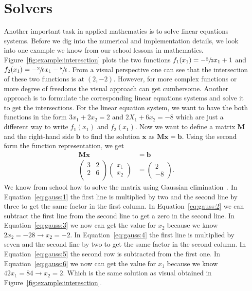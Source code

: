 \documentclass[11pt,fleqn]{book} %
\begin{document}
\chapter{Solvers}
Another important task in applied mathematics is to solve linear equations systems. Before we dig into the numerical and implementation details, we look into one example we know from our school lessons in mathematics. Figure~\ref{fig:example:interesction} plots the two functions $f_1(x_1)=-\sfrac{3}{2}x_1+1$ and  $f_2(x_1)=-\sfrac{2}{6}x_1-\sfrac{8}{6}$. From a visual perspective one can see that the intersection of these two functions is at $(2,-2)$. However, for more complex functions or more degree of freedoms the visual approach can get cumbersome. Another approach is to formulate the corresponding linear equations systems and solve it to get the intersections. For the linear equation system, we want to have the both functions in the form $3x_1+2x_2=2$ and $2X_1+6x_2=-8$ which are just a different way to write $f_1(x_1)$ and $f_2(x_1)$. Now we want to define a matrix $\mathbf{M}$ and the right-hand side $\mathbf{b}$ to find the solution $\mathbf{x}$ as $\mathbf{M}\mathbf{x}=\mathbf{b}$. Using the second form the function representation, we get 
\begin{align}
\mathbf{M}\mathbf{x}&=\mathbf{b} \\
\left(\begin{matrix}
3 & 2 \\
2 & 6 \\
\end{matrix}\right)
\left(\begin{matrix}
x_1 \\
x_2
\end{matrix}\right)
&=\left(
\begin{matrix}
2 \\
-8
\end{matrix}\right)\text{.}
\end{align}
We know from school how to solve the matrix using Gaussian elimination~\cite{brown1999contextual}. In Equation~\eqref{eq:gauss:1} the first line is multiplied by two and the second line by three to get the same factor in the first column. In Equation~\eqref{eq:gauss:2} we can subtract the first line from the second line to get a zero in the second line. In Equation~\eqref{eq:gauss:3} we now can get the value for $x_2$ because we know $2x_2=-28\rightarrow x_2=-2$. In Equation~\eqref{eq:gauss:4} the first line is multiplied by seven and the second line by two to get the same factor in the second column. In Equation~\eqref{eq:gauss:5} the second row is subtracted from the first one. In Equation~\eqref{eq:gauss:6} we now can get the value for $x_1$ because we know $42x_1=84\rightarrow x_2=2$. Which is the same solution as visual obtained in Figure~\ref{fig:example:interesction}.\\
\end{document}
